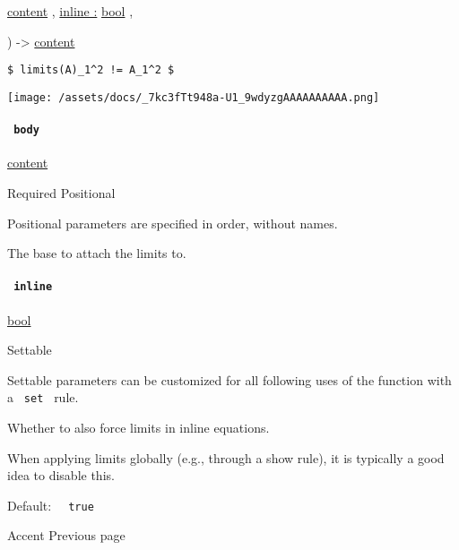 { \href{/docs/reference/foundations/content/}{content} , } {
\hyperref[functions-limits-parameters-inline]{inline :}
\href{/docs/reference/foundations/bool/}{bool} , }

) -\textgreater{} \href{/docs/reference/foundations/content/}{content}

\begin{verbatim}
$ limits(A)_1^2 != A_1^2 $
\end{verbatim}

\texttt{[image: /assets/docs/\_7kc3fTt948a-U1\_9wdyzgAAAAAAAAAA.png]}

\paragraph{\texorpdfstring{\texttt{\ body\ }}{ body }}\label{functions-limits-body}

\href{/docs/reference/foundations/content/}{content}

{Required} {{ Positional }}

\label{functions-limits-body-positional-tooltip}
Positional parameters are specified in order, without names.

The base to attach the limits to.

\paragraph{\texorpdfstring{\texttt{\ inline\ }}{ inline }}\label{functions-limits-inline}

\href{/docs/reference/foundations/bool/}{bool}

{{ Settable }}

\label{functions-limits-inline-settable-tooltip}
Settable parameters can be customized for all following uses of the
function with a \texttt{\ set\ } rule.

Whether to also force limits in inline equations.

When applying limits globally (e.g., through a show rule), it is
typically a good idea to disable this.

Default: \texttt{\ }{\texttt{\ true\ }}\texttt{\ }

\href{/docs/reference/math/accent/}{\pandocbounded{}}

{ Accent } { Previous page }

\href{/docs/reference/math/binom/}{\pandocbounded{}}

